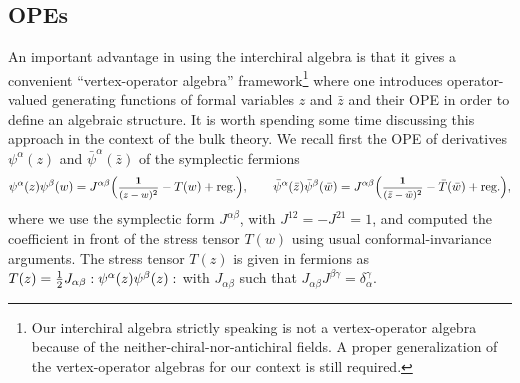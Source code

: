 \documentclass[11pt]{article}
\newcommand{\one}{\boldsymbol{1}}%
\newcommand{\ffrac}[2]{\mbox{\footnotesize$\displaystyle\frac{#1}{#2}$}}
\newcommand{\half}{%
  \mathchoice{\ffrac{1}{2}}{\frac{1}{2}}{\frac{1}{2}}{\frac{1}{2}}}
\newcommand{\bz}{\bar{z}}
\newcommand{\bw}{\bar{w}}
\theoremstyle{definition}
\begin{document}
\subsection{OPEs}

An important advantage in using the interchiral algebra is that it gives a convenient ``vertex-operator algebra'' framework\footnote{Our interchiral algebra strictly speaking is not a vertex-operator algebra because of the neither-chiral-nor-antichiral fields. A proper generalization of the vertex-operator algebras for our context is still required.} where one introduces operator-valued generating functions of formal variables $z$ and $\bz$ and their OPE in order to define an algebraic structure.
It is worth spending some time discussing this approach in the context of the bulk theory.
We recall first the OPE of derivatives $\psi^{\alpha}(z)$ and $\bar{\psi}^{\alpha}(\bz)$ of the symplectic fermions
\begin{equation}\label{sympl-fer-OPE}
\psi^{\alpha}(z)\psi^{\beta}(w) = J^{\alpha \beta} \Bigl(\ffrac{\one}{(z-w)^2} - T(w) + \text{reg.}\Bigr),\qquad
\bar{\psi}^{\alpha}(\bz) \bar{\psi}^{\beta}(\bw) = J^{\alpha \beta}  \Bigl(\ffrac{\one}{(\bz-\bw)^2} - \bar{T}(\bw) + \text{reg.}\Bigr),
\end{equation}
where we use the symplectic form $J^{\alpha \beta}$, with $J^{12}=-J^{21}=1$, and computed the coefficient in front of the stress tensor $T(w)$ using usual conformal-invariance arguments.
The stress tensor $T(z)$ is given in fermions as $T(z)=\half J_{\alpha\beta}:\psi^{\alpha}(z)\psi^{\beta}(z):$ with $J_{\alpha\beta}$ such that $J_{\alpha\beta}J^{\beta\gamma}=\delta^{\gamma}_{\alpha}$.
\end{document}
